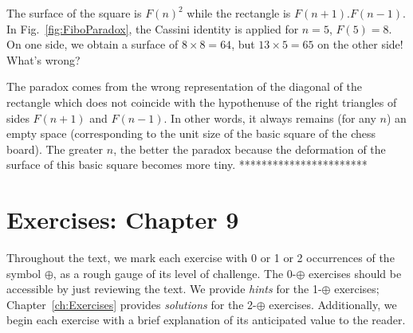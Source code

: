 {The surface of the square is $F(n)^2$ while the rectangle is $F(n+1).F(n-1)$.
In Fig.~\ref{fig:FiboParadox}, the Cassini identity is applied for $n=5$, $F(5)=8$. 
On one side, we obtain a surface of $8 \times 8 = 64$, but $13 \times 5 = 65$ on the other side!
What's wrong?

The paradox comes from the wrong representation of the diagonal of the rectangle which does not coincide with the hypothenuse
of the right triangles of sides $F(n+1)$ and $F(n-1)$.
In other words, it always remains (for any $n$) an empty space (corresponding to the unit size of the basic square of the chess board).
The greater $n$, the better the paradox because the deformation of the surface of this basic square becomes more tiny. 
***********************}



\section{Exercises: Chapter 9}

Throughout the text, we mark each exercise with 0 or 1 or 2 occurrences of the symbol $\oplus$, as a rough gauge of its level of challenge.  The 0-$\oplus$ exercises should be accessible by just reviewing the text.  We provide {\em hints} for the 1-$\oplus$ exercises; Chapter~\ref{ch:Exercises} provides {\em solutions} for the 2-$\oplus$ exercises.  Additionally, we begin each exercise with a brief explanation of its anticipated value to the reader.

